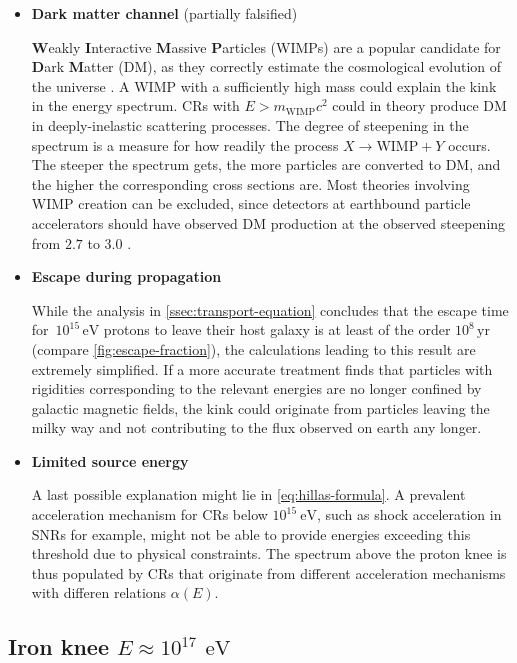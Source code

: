 \begin{itemize}
	\item \textbf{Dark matter channel} (partially falsified)

	\textbf{W}eakly \textbf{I}nteractive \textbf{M}assive \textbf{P}articles (WIMPs) are a popular candidate for \textbf{D}ark \textbf{M}atter (DM), as they 
	correctly estimate the cosmological evolution of the universe \cite{klypin1993structure}. A WIMP with a sufficiently high mass could explain the kink in the 
	energy spectrum. CRs with $E > m_\text{WIMP}c^2$ could in theory produce DM in deeply-inelastic scattering processes. The degree of steepening in the spectrum 
	is a measure for how readily the process $X \rightarrow \text{WIMP} + Y$ occurs. The steeper the spectrum gets, the more particles are converted to DM, and the
	higher the corresponding cross sections are. Most theories involving WIMP creation can be excluded, since detectors at earthbound particle accelerators should 
	have observed DM production at the observed steepening from $2.7$ to $3.0$ \cite{donato2009constraints}.

	\item \textbf{Escape during propagation}

	While the analysis in \autoref{ssec:transport-equation} concludes that the escape time for $\,10^{15}\,\text{eV}$ protons to leave their host 	galaxy is at 
	least of the order ${10^{8}}\,\text{yr}$ (compare \autoref{fig:escape-fraction}), the calculations leading to this result are extremely simplified. If a more 
	accurate treatment finds that particles with rigidities corresponding to the relevant energies are no longer confined by galactic magnetic fields, the kink 
	could originate from particles leaving the milky way and not contributing to the flux observed on earth any longer.

	\item \textbf{Limited source energy}

	A last possible explanation might lie in \autoref{eq:hillas-formula}. A prevalent acceleration mechanism for CRs below $10^{15}\SI{}{\electronvolt}$, such as 
	shock acceleration in SNRs for example, might not be able to provide energies exceeding this threshold due to physical constraints. The spectrum above the 
	proton knee is thus populated by CRs that originate from different acceleration mechanisms with differen relations $\alpha(E)$.
\end{itemize}

\subsection{Iron knee $E \approx 10^{17}\,\SI{}{\electronvolt}$}
\label{ssec:cr-iron-knee}

